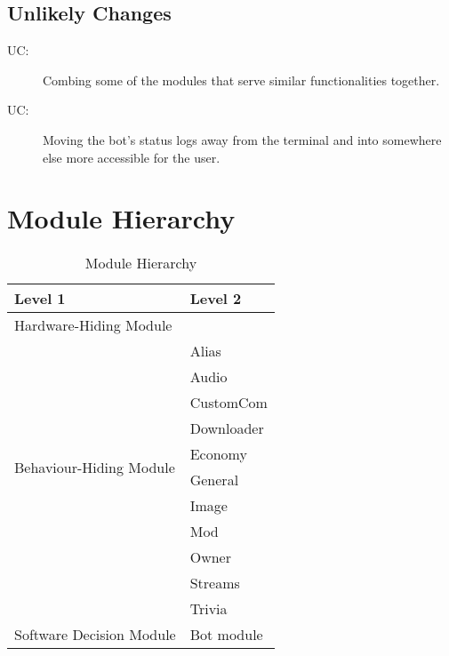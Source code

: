 \documentclass[12pt, titlepage]{article}
\newcounter{ucnum}
\newcommand{\uctheucnum}{UC\theucnum}
\begin{document}
\subsection{Unlikely Changes} \label{SecUchange}

\begin{description}
\item[ \uctheucnum \label{ucModules}:] Combing some of the modules that serve similar functionalities together.
\item[ \uctheucnum \label{ucOutput}:] Moving the bot's status logs away from the terminal and into somewhere else more accessible for the user.

\end{description}

\section{Module Hierarchy} \label{SecMH}

\begin{description}
\item 
\end{description}


\begin{table}[H]
\centering
\begin{tabular}{p{} p{}}
\toprule
\textbf{Level 1} & \textbf{Level 2}\\
\midrule

{Hardware-Hiding Module} & ~ \\
\midrule

\multirow{10}{0.3\textwidth}{Behaviour-Hiding Module} & Alias\\
& Audio\\
& CustomCom\\
& Downloader\\
& Economy\\
& General\\
& Image\\ 
& Mod\\
& Owner\\
& Streams\\
& Trivia\\
\midrule

\multirow{1}{0.3\textwidth}{Software Decision Module} & {Bot module}\\
\bottomrule

\end{tabular}
\caption{Module Hierarchy}
\label{TblMH}
\end{table}
\end{document}
